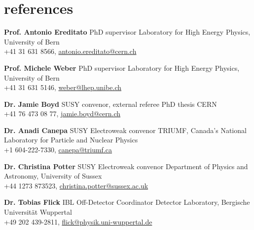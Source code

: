 \documentclass[]{cv} %
\begin{document}
\ifreferences
\section{references}

\begin{entrylist}

  \entry
  {}
  {\textbf{Prof. Antonio Ereditato}}
  {PhD supervisor}
  {Laboratory for High Energy Physics, University of Bern\\+41 31 631 8566, \href{mailto:antonio.ereditato@cern.ch}{antonio.ereditato@cern.ch}}

  \entry
  {}
  {\textbf{Prof. Michele Weber}}
  {PhD supervisor}
  {Laboratory for High Energy Physics, University of Bern\\+41 31 631 5146, \href{mailto:weber@lhep.unibe.ch}{weber@lhep.unibe.ch}}

  \entry
  {}
  {\textbf{Dr. Jamie Boyd}}
  {SUSY convenor, external referee PhD thesis}
  {CERN\\+41 76 473 08 77, \href{mailto:jamie.boyd@cern.ch}{jamie.boyd@cern.ch}}

  \entry
  {}
  {\textbf{Dr. Anadi Canepa}}
  {SUSY Electroweak convenor}
  {TRIUMF, Canada's National Laboratory for Particle and Nuclear Physics\\+1 604-222-7330, \href{mailto:canepa@triumf.ca}{canepa@triumf.ca}}

  \entry
  {}
  {\textbf{Dr. Christina Potter}}
  {SUSY Electroweak convenor}
  {Department of Physics and Astronomy, University of Sussex\\+44 1273 873523, \href{mailto:christina.potter@sussex.ac.uk}{christina.potter@sussex.ac.uk}}

  \entry
  {}
  {\textbf{Dr. Tobias Flick}}
  {IBL Off-Detector Coordinator}
  {Detector Laboratory, Bergische Universit{\"a}t Wuppertal\\+49 202 439-2811, \href{mailto:flick@physik.uni-wuppertal.de}{flick@physik.uni-wuppertal.de}}

\end{entrylist}
\fi
\end{document}
